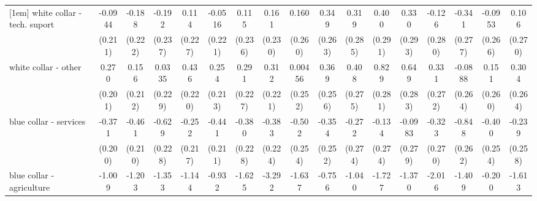{\begin{tabular}{l*{16}{c}}
[1em]
white collar - tech. suport&     -0.0944         &      -0.188         &      -0.192         &       0.114         &     -0.0516         &       0.115         &       0.161         &       0.160         &       0.349         &       0.319         &       0.400         &       0.330         &      -0.126         &      -0.341         &     -0.0953         &       0.106         \\
                    &     (0.211)         &     (0.222)         &     (0.237)         &     (0.227)         &     (0.221)         &     (0.236)         &     (0.230)         &     (0.260)         &     (0.263)         &     (0.285)         &     (0.291)         &     (0.293)         &     (0.280)         &     (0.277)         &     (0.266)         &     (0.270)         \\
[1em]
white collar - other&       0.270         &       0.156         &      0.0335         &       0.436\sym{*}  &       0.254         &       0.291         &       0.312         &     0.00456         &       0.369         &       0.408         &       0.829\sym{**} &       0.649\sym{*}  &       0.331         &     -0.0888         &       0.151         &       0.304         \\
                    &     (0.201)         &     (0.212)         &     (0.229)         &     (0.220)         &     (0.213)         &     (0.227)         &     (0.221)         &     (0.252)         &     (0.256)         &     (0.275)         &     (0.281)         &     (0.283)         &     (0.272)         &     (0.264)         &     (0.260)         &     (0.264)         \\
[1em]
blue collar - services&      -0.371         &      -0.461\sym{*}  &      -0.629\sym{**} &      -0.252         &      -0.441\sym{*}  &      -0.380         &      -0.383         &      -0.502\sym{*}  &      -0.354         &      -0.272         &      -0.134         &     -0.0983         &      -0.323         &      -0.848\sym{**} &      -0.400         &      -0.239         \\
                    &     (0.200)         &     (0.210)         &     (0.228)         &     (0.217)         &     (0.211)         &     (0.228)         &     (0.224)         &     (0.254)         &     (0.252)         &     (0.274)         &     (0.274)         &     (0.279)         &     (0.270)         &     (0.262)         &     (0.254)         &     (0.258)         \\
[1em]
blue collar - agriculture&      -1.009         &      -1.203         &      -1.353\sym{*}  &      -1.144         &      -0.932         &      -1.625\sym{*}  &      -3.292\sym{***}&      -1.637\sym{**} &      -0.756         &      -1.040         &      -1.727\sym{*}  &      -1.370         &      -2.016\sym{*}  &      -1.409\sym{*}  &      -0.200         &      -1.613\sym{**} \\

\end{tabular}}
